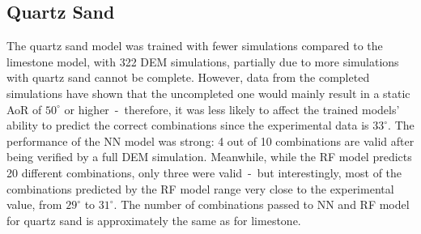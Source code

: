 \begin{table}[H]
    \centering
    \caption{Valid contact law parameters identified by the RF model for limestone and their respective simulation results.}
    \label{table:eskalRF}
\end{table}


\subsection{Quartz Sand}

The quartz sand model was trained with fewer simulations compared to the limestone model, with 322 DEM simulations, partially due to more simulations with quartz sand cannot be complete. However, data from the completed simulations have shown that the uncompleted one would mainly result in a static AoR of $50^{\circ}$ or higher~-~therefore, it was less likely to affect the trained models' ability to predict the correct combinations since the experimental data is $33^{\circ}$. The performance of the NN model was strong: 4 out of 10 combinations are valid after being verified by a full DEM simulation. Meanwhile, while the RF model predicts 20 different combinations, only three were valid~-~but interestingly, most of the combinations predicted by the RF model range very close to the experimental value, from $29^{\circ}$ to $31^{\circ}$. The number of combinations passed to NN and RF model for quartz sand is approximately the same as for limestone. 

